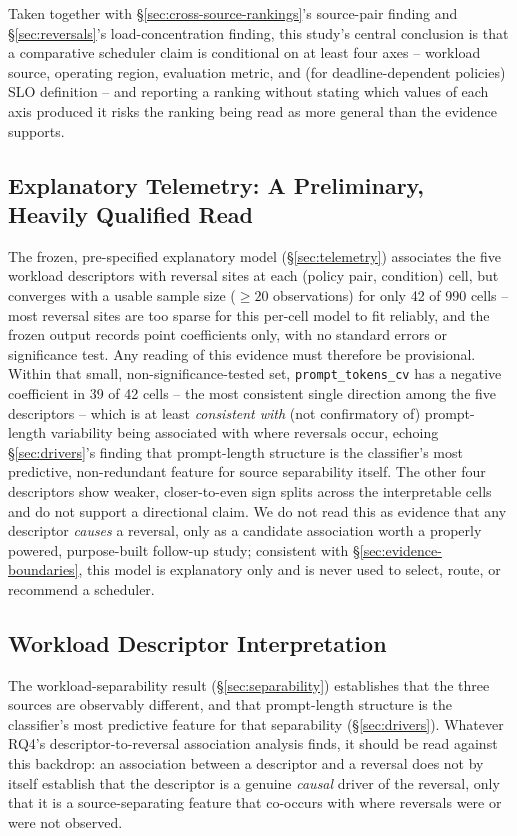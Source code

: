Taken together with \S\ref{sec:cross-source-rankings}'s source-pair finding
and \S\ref{sec:reversals}'s load-concentration finding, this study's central
conclusion is that a comparative scheduler claim is conditional on at least
four axes -- workload source, operating region, evaluation metric, and (for
deadline-dependent policies) SLO definition -- and reporting a ranking
without stating which values of each axis produced it risks the ranking
being read as more general than the evidence supports.

\subsection{Explanatory Telemetry: A Preliminary, Heavily Qualified Read}
\label{sec:telemetry-explanation}

The frozen, pre-specified explanatory model (\S\ref{sec:telemetry})
associates the five workload
descriptors with reversal sites at each (policy pair, condition) cell, but
converges with a usable sample size ($\geq 20$ observations) for only 42 of
990 cells -- most reversal sites are too sparse for this per-cell model to
fit reliably, and the frozen output records point coefficients only, with
no standard errors or significance test. Any reading of this evidence must
therefore be provisional. Within that small, non-significance-tested set,
\texttt{prompt\_tokens\_cv} has a negative coefficient in 39 of 42 cells --
the most consistent single direction among the five descriptors -- which
is at least \emph{consistent with} (not confirmatory of) prompt-length
variability being associated with where reversals occur, echoing
\S\ref{sec:drivers}'s finding that prompt-length structure is the
classifier's most predictive, non-redundant feature for source
separability itself. The other four descriptors show
weaker, closer-to-even sign splits across the interpretable cells and do
not support a directional claim. We do not read this as evidence that any
descriptor \emph{causes} a reversal, only as a candidate association worth
a properly powered, purpose-built follow-up study; consistent with
\S\ref{sec:evidence-boundaries}, this model is explanatory only and is
never used to select, route, or recommend a scheduler.

\subsection{Workload Descriptor Interpretation}

The workload-separability result (\S\ref{sec:separability}) establishes
that the three sources are observably different, and that prompt-length
structure is the classifier's most predictive feature for that separability
(\S\ref{sec:drivers}). Whatever RQ4's descriptor-to-reversal association
analysis finds, it should be read against this backdrop: an association
between a descriptor and a reversal does not by itself establish that the
descriptor is a genuine \emph{causal} driver of the reversal, only that it
is a source-separating feature that co-occurs with where reversals were or
were not observed.

